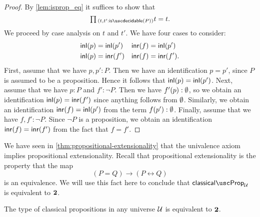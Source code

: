 \begin{proof}
  By \cref{lem:isprop_eq} it suffices to show that
  \begin{equation*}
    \prd{t,t':\isdecidable(P)}t=t.
  \end{equation*}
  We proceed by case analysis on $t$ and $t'$. We have four cases to consider:
  \begin{align*}
    {\mathsf{inl}}(p) & ={\mathsf{inl}}(p') & {\mathsf{inr}}(f) & ={\mathsf{inl}}(p') \\
    {\mathsf{inl}}(p) & ={\mathsf{inr}}(f') & {\mathsf{inr}}(f) & ={\mathsf{inr}}(f').
  \end{align*}
  First, assume that we have $p,p':P$. Then we have an identification $p=p'$, since $P$ is assumed to be a proposition. Hence it follows that ${\mathsf{inl}}(p)={\mathsf{inl}}(p')$. Next, assume that we have $p:P$ and $f':\neg P$. Then we have $f'(p):\emptyset$, so we obtain an identification ${\mathsf{inl}}(p)={\mathsf{inr}}(f')$ since anything follows from $\emptyset$. Similarly, we obtain an identification ${\mathsf{inr}}(f)={\mathsf{inl}}(p')$ from the term $f(p'):\emptyset$. Finally, assume that we have $f,f':\neg P$. Since $\neg P$ is a proposition, we obtain an identification ${\mathsf{inr}}(f)={\mathsf{inr}}(f')$ from the fact that $f=f'$.
\end{proof}

We have seen in \cref{thm:propositional-extensionality} that the univalence axiom implies propositional extensionality. Recall that propositional extensionality is the property that the map
\begin{equation*}
  (P=Q)\to (P\leftrightarrow Q)
\end{equation*}
is an equivalence. We will use this fact here to conclude that $\classicalprop_\UU$ is equivalent to $\mathbf{2}$.

\begin{prp}
  The type of classical propositions in any universe $\mathcal{U}$ is equivalent to $\mathbf{2}$.%
\end{prp}

